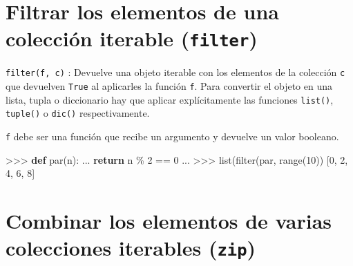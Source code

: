 \documentclass[
  spanish,
  a4paper,
]{scrreport}
\newenvironment{Shaded}{\begin{snugshade}}{\end{snugshade}}
\newcommand{\BuiltInTok}[1]{\textcolor[rgb]{0.00,0.23,0.31}{#1}}
\newcommand{\ControlFlowTok}[1]{\textcolor[rgb]{0.00,0.23,0.31}{\textbf{#1}}}
\newcommand{\DecValTok}[1]{\textcolor[rgb]{0.68,0.00,0.00}{#1}}
\newcommand{\KeywordTok}[1]{\textcolor[rgb]{0.00,0.23,0.31}{\textbf{#1}}}
\newcommand{\NormalTok}[1]{\textcolor[rgb]{0.00,0.23,0.31}{#1}}
\newcommand{\OperatorTok}[1]{\textcolor[rgb]{0.37,0.37,0.37}{#1}}
\begin{document}
\section{\texorpdfstring{Filtrar los elementos de una colección iterable
(\texttt{filter})}{Filtrar los elementos de una colección iterable (filter)}}\label{filtrar-los-elementos-de-una-colecciuxf3n-iterable-filter}

\texttt{filter(f,\ c)} : Devuelve una objeto iterable con los elementos
de la colección \texttt{c} que devuelven \texttt{True} al aplicarles la
función \texttt{f}. Para convertir el objeto en una lista, tupla o
diccionario hay que aplicar explícitamente las funciones
\texttt{list()}, \texttt{tuple()} o \texttt{dic()} respectivamente.

\begin{tcolorbox}[enhanced jigsaw, arc=.35mm, bottomrule=.15mm, bottomtitle=1mm, breakable, colback=white, colbacktitle=quarto-callout-warning-color!10!white, colframe=quarto-callout-warning-color-frame, coltitle=black, left=2mm, leftrule=.75mm, opacityback=0, opacitybacktitle=0.6, rightrule=.15mm, title=\textcolor{quarto-callout-warning-color}{\faExclamationTriangle}\hspace{0.5em}{Advertencia}, titlerule=0mm, toprule=.15mm, toptitle=1mm]

\texttt{f} debe ser una función que recibe un argumento y devuelve un
valor booleano.

\end{tcolorbox}

\begin{Shaded}
\begin{Highlighting}[]
\OperatorTok{\textgreater{}\textgreater{}\textgreater{}} \KeywordTok{def}\NormalTok{ par(n):}
\NormalTok{...     }\ControlFlowTok{return}\NormalTok{ n }\OperatorTok{\%} \DecValTok{2} \OperatorTok{==} \DecValTok{0}
\NormalTok{...}
\OperatorTok{\textgreater{}\textgreater{}\textgreater{}} \BuiltInTok{list}\NormalTok{(}\BuiltInTok{filter}\NormalTok{(par, }\BuiltInTok{range}\NormalTok{(}\DecValTok{10}\NormalTok{))}
\NormalTok{[}\DecValTok{0}\NormalTok{, }\DecValTok{2}\NormalTok{, }\DecValTok{4}\NormalTok{, }\DecValTok{6}\NormalTok{, }\DecValTok{8}\NormalTok{]}
\end{Highlighting}
\end{Shaded}

\section{\texorpdfstring{Combinar los elementos de varias colecciones
iterables
(\texttt{zip})}{Combinar los elementos de varias colecciones iterables (zip)}}\label{combinar-los-elementos-de-varias-colecciones-iterables-zip}
\end{document}
